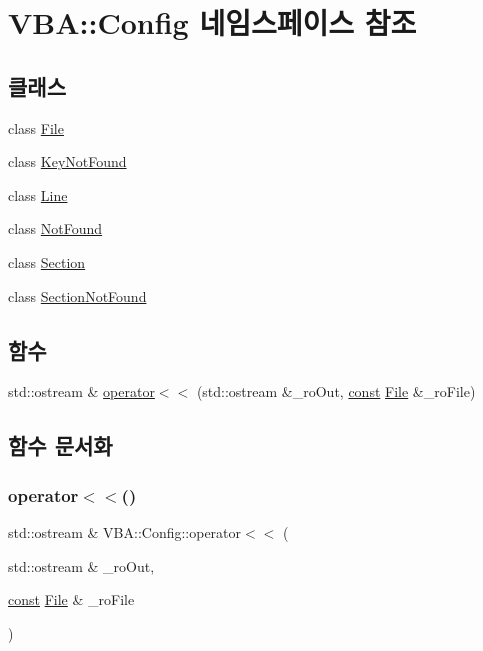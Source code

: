 \hypertarget{namespace_v_b_a_1_1_config}{}\section{V\+BA\+:\+:Config 네임스페이스 참조}
\label{namespace_v_b_a_1_1_config}
\subsection*{클래스}
\begin{DoxyCompactItemize}
\item 
class \mbox{\hyperlink{class_v_b_a_1_1_config_1_1_file}{File}}
\item 
class \mbox{\hyperlink{class_v_b_a_1_1_config_1_1_key_not_found}{Key\+Not\+Found}}
\item 
class \mbox{\hyperlink{class_v_b_a_1_1_config_1_1_line}{Line}}
\item 
class \mbox{\hyperlink{class_v_b_a_1_1_config_1_1_not_found}{Not\+Found}}
\item 
class \mbox{\hyperlink{class_v_b_a_1_1_config_1_1_section}{Section}}
\item 
class \mbox{\hyperlink{class_v_b_a_1_1_config_1_1_section_not_found}{Section\+Not\+Found}}
\end{DoxyCompactItemize}
\subsection*{함수}
\begin{DoxyCompactItemize}
\item 
std\+::ostream \& \mbox{\hyperlink{namespace_v_b_a_1_1_config_ae8f486bb30184451079a550ba9de3d7e}{operator$<$$<$}} (std\+::ostream \&\+\_\+ro\+Out, \mbox{\hyperlink{getopt1_8c_a2c212835823e3c54a8ab6d95c652660e}{const}} \mbox{\hyperlink{class_v_b_a_1_1_config_1_1_file}{File}} \&\+\_\+ro\+File)
\end{DoxyCompactItemize}


\subsection{함수 문서화}
\mbox{\label{namespace_v_b_a_1_1_config_ae8f486bb30184451079a550ba9de3d7e}} 
\subsubsection{\texorpdfstring{operator$<$$<$()}{operator<<()}}
{\footnotesize\ttfamily std\+::ostream \& V\+B\+A\+::\+Config\+::operator$<$$<$ (\begin{DoxyParamCaption}\item[{std\+::ostream \&}]{\+\_\+ro\+Out,  }\item[{\mbox{\hyperlink{getopt1_8c_a2c212835823e3c54a8ab6d95c652660e}{const}} \mbox{\hyperlink{class_v_b_a_1_1_config_1_1_file}{File}} \&}]{\+\_\+ro\+File }\end{DoxyParamCaption})}



